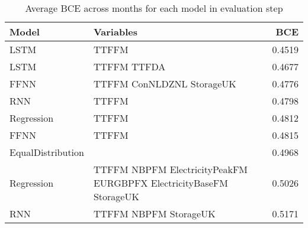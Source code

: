 \begin{table}[h!]
\centering
 \begin{adjustbox}{max width=\textwidth}
\begin{tabular}{llr}
  \hline
Model & Variables & BCE \\ 
  \hline
LSTM & TTFFM  & 0.4519 \\ 
  LSTM & TTFFM TTFDA & 0.4677 \\ 
  FFNN & TTFFM ConNLDZNL StorageUK & 0.4776 \\ 
  RNN & TTFFM  & 0.4798 \\ 
  Regression & TTFFM  & 0.4812 \\ 
  FFNN & TTFFM  & 0.4815 \\ 
  EqualDistribution &  & 0.4968 \\ 
  Regression & TTFFM NBPFM ElectricityPeakFM EURGBPFX ElectricityBaseFM StorageUK & 0.5026 \\ 
  RNN & TTFFM NBPFM StorageUK & 0.5171 \\ 
   \hline
 \end{tabular}
\end{adjustbox}
\caption{Average BCE across months for each model in evaluation step} 
\label{tab:binary.eval.short}
\end{table}

